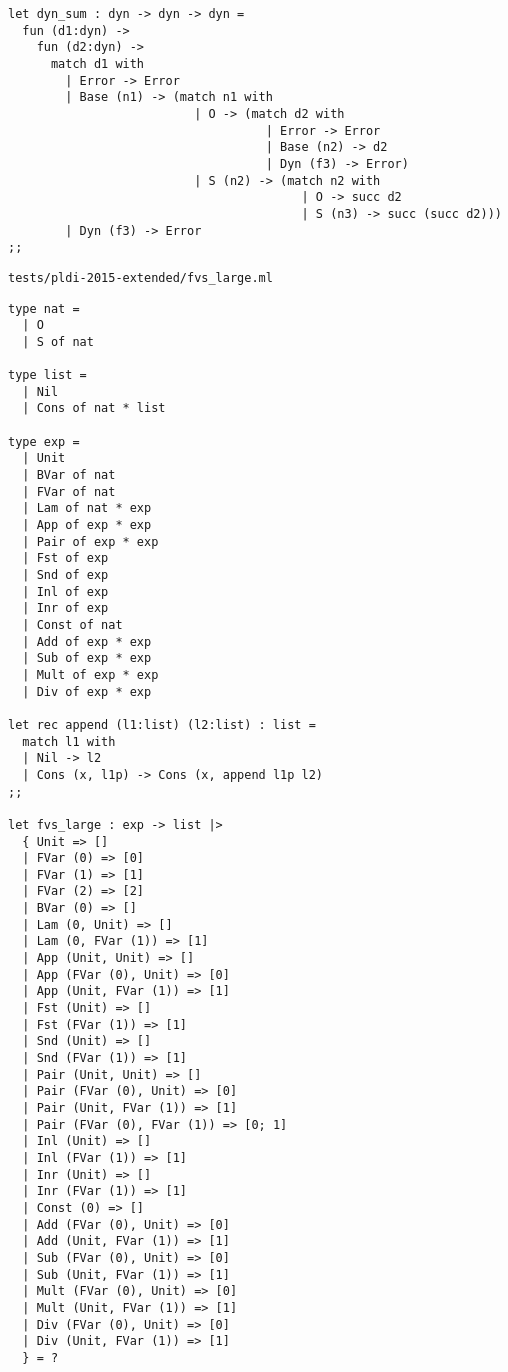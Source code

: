 \begin{verbatim}
let dyn_sum : dyn -> dyn -> dyn =
  fun (d1:dyn) ->
    fun (d2:dyn) ->
      match d1 with
        | Error -> Error
        | Base (n1) -> (match n1 with
                          | O -> (match d2 with
                                    | Error -> Error
                                    | Base (n2) -> d2
                                    | Dyn (f3) -> Error)
                          | S (n2) -> (match n2 with
                                         | O -> succ d2
                                         | S (n3) -> succ (succ d2)))
        | Dyn (f3) -> Error
;;
\end{verbatim}

\noindent\large\texttt{tests/pldi-2015-extended/fvs\_large.ml}
\begin{verbatim}
type nat =
  | O
  | S of nat

type list =
  | Nil
  | Cons of nat * list

type exp =
  | Unit
  | BVar of nat
  | FVar of nat
  | Lam of nat * exp
  | App of exp * exp
  | Pair of exp * exp
  | Fst of exp
  | Snd of exp
  | Inl of exp
  | Inr of exp
  | Const of nat
  | Add of exp * exp
  | Sub of exp * exp
  | Mult of exp * exp
  | Div of exp * exp

let rec append (l1:list) (l2:list) : list =
  match l1 with
  | Nil -> l2
  | Cons (x, l1p) -> Cons (x, append l1p l2)
;;

let fvs_large : exp -> list |>
  { Unit => []
  | FVar (0) => [0]
  | FVar (1) => [1]
  | FVar (2) => [2]
  | BVar (0) => []
  | Lam (0, Unit) => []
  | Lam (0, FVar (1)) => [1]
  | App (Unit, Unit) => []
  | App (FVar (0), Unit) => [0]
  | App (Unit, FVar (1)) => [1]
  | Fst (Unit) => []
  | Fst (FVar (1)) => [1]
  | Snd (Unit) => []
  | Snd (FVar (1)) => [1]
  | Pair (Unit, Unit) => []
  | Pair (FVar (0), Unit) => [0]
  | Pair (Unit, FVar (1)) => [1]
  | Pair (FVar (0), FVar (1)) => [0; 1]
  | Inl (Unit) => []
  | Inl (FVar (1)) => [1]
  | Inr (Unit) => []
  | Inr (FVar (1)) => [1]
  | Const (0) => []
  | Add (FVar (0), Unit) => [0]
  | Add (Unit, FVar (1)) => [1]
  | Sub (FVar (0), Unit) => [0]
  | Sub (Unit, FVar (1)) => [1]
  | Mult (FVar (0), Unit) => [0]
  | Mult (Unit, FVar (1)) => [1]
  | Div (FVar (0), Unit) => [0]
  | Div (Unit, FVar (1)) => [1]
  } = ?
\end{verbatim}

